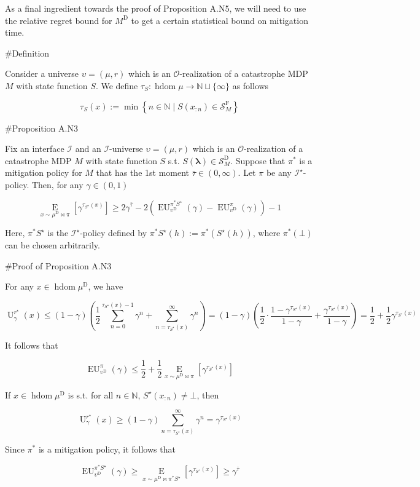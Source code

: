 \documentclass[a4paper]{article}
\newcommand{\AP}[1]{\left(#1\right)}
\newcommand{\AB}[1]{\left[#1\right]}
\newcommand{\AC}[1]{\left\{#1\right\}}
\newcommand{\Ea}[2]{\underset{#1}{\operatorname{E}}\AB{#2}}
\newcommand{\Nats}{\mathbb{N}}
\newcommand{\Estr}{\boldsymbol{\lambda}}
\newcommand{\Ob}{\mathcal{O}}
\newcommand{\St}{\mathcal{S}}
\newcommand{\In}{\mathcal{I}}
\DeclareMathOperator{\HD}{hdom}
\newcommand{\RMD}{\mathrm{D}}
\newcommand{\RMF}{\mathrm{F}}
\newcommand{\SF}{\St^{\RMF}}
\newcommand{\SD}{\St^{\RMD}}
\newcommand{\MD}{M^{\RMD}}
\newcommand{\UD}{\upsilon^{\RMD}}
\newcommand{\Ut}{\operatorname{U}}
\newcommand{\EU}{\operatorname{EU}}
\begin{document}
As a final ingredient towards the proof of Proposition A.N5, we will need to use the relative regret bound for $\MD$ to get a certain statistical bound on mitigation time.

\#Definition 

Consider a universe $\upsilon=(\mu,r)$ which is an $\Ob$-realization of a catastrophe MDP $M$ with state function $S$. We define $\tau_S: \HD{\mu} \rightarrow \Nats \sqcup \{\infty\}$ as follows

$$\tau_S(x) := \min\AC{n \in \Nats \mid S\AP{x_{:n}} \in \SF_M}$$

\#Proposition A.N3

Fix an interface $\In$ and an $\In$-universe $\upsilon=(\mu,r)$ which is an $\Ob$-realization of a catastrophe MDP $M$ with state function $S$ s.t. $S(\Estr)\in\SD_M$. Suppose that $\pi^*$ is a mitigation policy for $M$ that has the 1st moment $\bar{\tau}\in(0,\infty)$. Let $\pi$ be any $\In^\star$-policy. Then, for any $\gamma\in(0,1)$

$$\Ea{x\sim\mu^\RMD\bowtie\pi}{\gamma^{\tau_{S^\star}(x)}} \geq 2\gamma^{\bar{\tau}}-2\AP{\EU_{\UD}^{\pi^* S^\star}(\gamma)-\EU_{\UD}^{\pi}(\gamma)}-1$$

Here, $\pi^* S^\star$ is the $\In^\star$-policy defined by $\pi^*S^\star(h):=\pi^*\AP{S^\star(h)}$, where $\pi^*(\bot)$ can be chosen arbitrarily.

\#Proof of Proposition A.N3

For any $x \in \HD{\mu^\RMD}$, we have

$$\Ut^{r^\star}_\gamma(x) \leq (1-\gamma)\AP{\frac{1}{2}\sum_{n=0}^{\tau_{S^\star}(x)-1}{\gamma^n} + \sum_{n=\tau_{S^\star}(x)}^\infty \gamma^n} = (1-\gamma)\AP{\frac{1}{2} \cdot \frac{1 - \gamma^{\tau_{S^\star}(x)}}{1-\gamma}+\frac{\gamma^{\tau_{S^\star}(x)}}{1-\gamma}}=\frac{1}{2}+\frac{1}{2}\gamma^{\tau_{S^\star}(x)}$$

It follows that

$$\EU_{\UD}^\pi(\gamma) \leq \frac{1}{2}+\frac{1}{2}\Ea{x\sim\mu^\RMD\bowtie\pi}{\gamma^{\tau_{S^\star}(x)}}$$

If $x \in \HD{\mu^\RMD}$ is s.t. for all $n\in\Nats$, $S^\star\AP{x_{:n}}\ne\bot$, then

$$\Ut^{r^\star}_\gamma(x) \geq (1-\gamma)\sum_{n=\tau_{S^\star}(x)}^\infty \gamma^n = \gamma^{\tau_{S^\star}(x)}$$

Since $\pi^*$ is a mitigation policy, it follows that

$$\EU_{\UD}^{\pi^*S^\star}(\gamma) \geq \Ea{x\sim\mu^\RMD\bowtie\pi^*S^\star}{\gamma^{\tau_{S^\star}(x)}} \geq \gamma^{\bar{\tau}}$$
\end{document}
